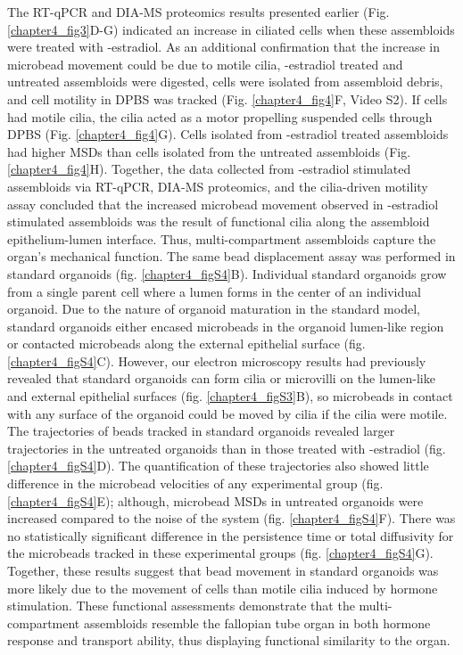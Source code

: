\begin{refsection}
    The RT-qPCR and DIA-MS proteomics results presented earlier (Fig. \ref{chapter4_fig3}D-G) indicated an increase in ciliated cells when these assembloids were treated with \textbeta-estradiol. As an additional confirmation that the increase in microbead movement could be due to motile cilia, \textbeta-estradiol treated and untreated assembloids were digested, cells were isolated from assembloid debris, and cell motility in DPBS was tracked (Fig. \ref{chapter4_fig4}F, Video S2). If cells had motile cilia, the cilia acted as a motor propelling suspended cells through DPBS\cite{garcia2018a} (Fig. \ref{chapter4_fig4}G). Cells isolated from \textbeta-estradiol treated assembloids had higher MSDs than cells isolated from the untreated assembloids (Fig. \ref{chapter4_fig4}H). Together, the data collected from \textbeta-estradiol stimulated assembloids via RT-qPCR, DIA-MS proteomics, and the cilia-driven motility assay concluded that the increased microbead movement observed in \textbeta-estradiol stimulated assembloids was the result of functional cilia along the assembloid epithelium-lumen interface. Thus, multi-compartment assembloids capture the organ’s mechanical function.
    The same bead displacement assay was performed in standard organoids (fig. \ref{chapter4_figS4}B). Individual standard organoids grow from a single parent cell where a lumen forms in the center of an individual organoid\cite{kessler2015a}. Due to the nature of organoid maturation in the standard model, standard organoids either encased microbeads in the organoid lumen-like region or contacted microbeads along the external epithelial surface (fig. \ref{chapter4_figS4}C). However, our electron microscopy results had previously revealed that standard organoids can form cilia or microvilli on the lumen-like and external epithelial surfaces (fig. \ref{chapter4_figS3}B), so microbeads in contact with any surface of the organoid could be moved by cilia if the cilia were motile. The trajectories of beads tracked in standard organoids revealed larger trajectories in the untreated organoids than in those treated with \textbeta-estradiol (fig. \ref{chapter4_figS4}D). The quantification of these trajectories also showed little difference in the microbead velocities of any experimental group (fig. \ref{chapter4_figS4}E); although, microbead MSDs in untreated organoids were increased compared to the noise of the system (fig. \ref{chapter4_figS4}F). There was no statistically significant difference in the persistence time or total diffusivity for the microbeads tracked in these experimental groups (fig. \ref{chapter4_figS4}G). Together, these results suggest that bead movement in standard organoids was more likely due to the movement of cells than motile cilia induced by hormone stimulation.
    These functional assessments demonstrate that the multi-compartment assembloids resemble the fallopian tube organ in both hormone response and transport ability, thus displaying functional similarity to the organ.
    

\end{refsection}
